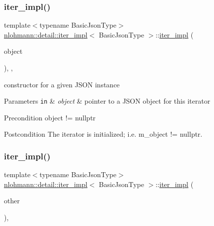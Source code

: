 \subsubsection{\texorpdfstring{iter\+\_\+impl()}{iter\_impl()}\hspace{0.1cm}{\footnotesize\ttfamily [2/3]}}
{\footnotesize\ttfamily template$<$typename Basic\+Json\+Type$>$ \\
\mbox{\hyperlink{classnlohmann_1_1detail_1_1iter__impl}{nlohmann\+::detail\+::iter\+\_\+impl}}$<$ Basic\+Json\+Type $>$\+::\mbox{\hyperlink{classnlohmann_1_1detail_1_1iter__impl}{iter\+\_\+impl}} (\begin{DoxyParamCaption}\item[{\mbox{\hyperlink{classnlohmann_1_1detail_1_1iter__impl_a69e52f890ce8c556fd68ce109e24b360}{pointer}}}]{object }\end{DoxyParamCaption})\hspace{0.3cm}{\ttfamily [inline]}, {\ttfamily [explicit]}, {\ttfamily [noexcept]}}



constructor for a given J\+S\+ON instance 


\begin{DoxyParams}[1]{Parameters}
\mbox{\tt in}  & {\em object} & pointer to a J\+S\+ON object for this iterator \\
\hline
\end{DoxyParams}
\begin{DoxyPrecond}{Precondition}
object != nullptr 
\end{DoxyPrecond}
\begin{DoxyPostcond}{Postcondition}
The iterator is initialized; i.\+e. {\ttfamily m\+\_\+object != nullptr}. 
\end{DoxyPostcond}
\mbox{\label{classnlohmann_1_1detail_1_1iter__impl_a867f7eb55091be31b013adb3e46816d3}} 
\subsubsection{\texorpdfstring{iter\+\_\+impl()}{iter\_impl()}\hspace{0.1cm}{\footnotesize\ttfamily [3/3]}}
{\footnotesize\ttfamily template$<$typename Basic\+Json\+Type$>$ \\
\mbox{\hyperlink{classnlohmann_1_1detail_1_1iter__impl}{nlohmann\+::detail\+::iter\+\_\+impl}}$<$ Basic\+Json\+Type $>$\+::\mbox{\hyperlink{classnlohmann_1_1detail_1_1iter__impl}{iter\+\_\+impl}} (\begin{DoxyParamCaption}\item[{const \mbox{\hyperlink{classnlohmann_1_1detail_1_1iter__impl}{iter\+\_\+impl}}$<$ typename std\+::remove\+\_\+const$<$ Basic\+Json\+Type $>$\+::type $>$ \&}]{other }\end{DoxyParamCaption})\hspace{0.3cm}{\ttfamily [inline]}, {\ttfamily [noexcept]}}



